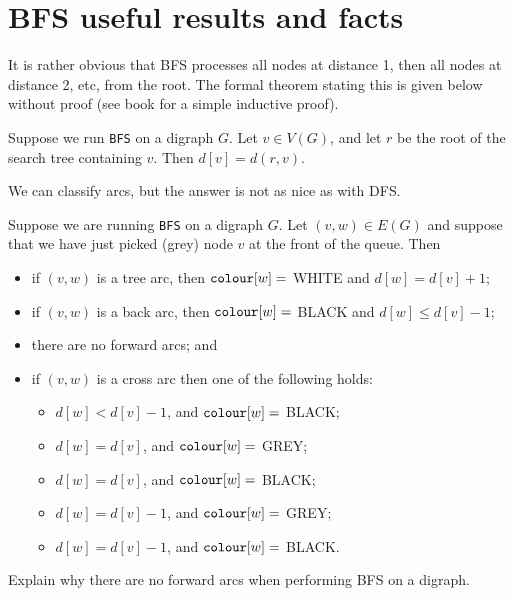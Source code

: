 \section{BFS useful results and facts} 
It is rather obvious that BFS processes all nodes at distance 1, then
all nodes at distance 2, etc, from the root. 
The formal theorem stating this is given below without proof (see book for a simple inductive proof).

\begin{Theorem} \label{thm:BFSdist}
Suppose we run \texttt{BFS} on a digraph $G$.
Let $v \in V(G)$, and let $r$ be the root of the search tree containing $v$. 
Then $d[v] = d(r, v)$.
\end{Theorem}

We can classify arcs, but the answer is not as nice as with DFS.

\begin{Theorem} \label{thm:BFS-arcclass}
Suppose we are running \texttt{BFS} on a digraph $G$. Let $(v,
w)\in E(G)$ and suppose that we have just picked (grey) node $v$ at the front of the queue.
Then
\begin{itemize}
  \item if $(v, w)$ is a tree arc, then $\operatorname{\text{\texttt{colour}}}[w] = $ WHITE and $d[w] = d[v] + 1$;
  \item if $(v, w)$ is a back arc, then $\operatorname{\text{\texttt{colour}}}[w] = $ BLACK and $d[w] \leq d[v] - 1$;
  \item there are no forward arcs; and
  \item if $(v, w)$ is a cross arc then one of the following holds:
  \begin{itemize}
	\item $d[w] < d[v] - 1$, and $\operatorname{\text{\texttt{colour}}}[w] = $ BLACK;
	\item $d[w] = d[v]$, and $\operatorname{\text{\texttt{colour}}}[w] = $ GREY;
	\item $d[w] = d[v]$, and $\operatorname{\text{\texttt{colour}}}[w] = $ BLACK;
	\item $d[w] = d[v] - 1$, and $\operatorname{\text{\texttt{colour}}}[w] = $ GREY;
	\item $d[w] = d[v] - 1$, and $\operatorname{\text{\texttt{colour}}}[w] = $ BLACK.
  \end{itemize}
\end{itemize}
\end{Theorem}

\begin{Boxample}[6]
Explain why there are no forward arcs when performing BFS on a digraph.
\end{Boxample}

